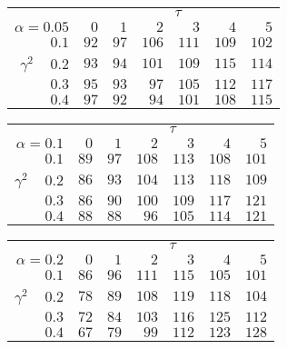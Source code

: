 \begin{tabular}{r|rrrrrr}
\hline\hline
 &\multicolumn{6}{c}{$\tau$} \\ 
 $\alpha = 0.05$ & $0$ & $1$ & $2$ & $3$ & $4$ & $5$ \\ 
 \hline$0.1$ & $ 92$ & $ 97$ & $106$ & $111$ & $109$ & $102$\\ 
$\gamma^2\;\;\;$ $0.2$ & $ 93$ & $ 94$ & $101$ & $109$ & $115$ & $114$\\ 
$0.3$ & $ 95$ & $ 93$ & $ 97$ & $105$ & $112$ & $117$\\ 
$0.4$ & $ 97$ & $ 92$ & $ 94$ & $101$ & $108$ & $115$\\ 
 \hline 
 \end{tabular}
 
 \vspace{2em} 
 
\begin{tabular}{r|rrrrrr}
\hline\hline
 &\multicolumn{6}{c}{$\tau$} \\ 
 $\alpha = 0.1$ & $0$ & $1$ & $2$ & $3$ & $4$ & $5$ \\ 
 \hline$0.1$ & $ 89$ & $ 97$ & $108$ & $113$ & $108$ & $101$\\ 
$\gamma^2\;\;\;$ $0.2$ & $ 86$ & $ 93$ & $104$ & $113$ & $118$ & $109$\\ 
$0.3$ & $ 86$ & $ 90$ & $100$ & $109$ & $117$ & $121$\\ 
$0.4$ & $ 88$ & $ 88$ & $ 96$ & $105$ & $114$ & $121$\\ 
 \hline 
 \end{tabular}
 
 \vspace{2em} 
 
\begin{tabular}{r|rrrrrr}
\hline\hline
 &\multicolumn{6}{c}{$\tau$} \\ 
 $\alpha = 0.2$ & $0$ & $1$ & $2$ & $3$ & $4$ & $5$ \\ 
 \hline$0.1$ & $ 86$ & $ 96$ & $111$ & $115$ & $105$ & $101$\\ 
$\gamma^2\;\;\;$ $0.2$ & $ 78$ & $ 89$ & $108$ & $119$ & $118$ & $104$\\ 
$0.3$ & $ 72$ & $ 84$ & $103$ & $116$ & $125$ & $112$\\ 
$0.4$ & $ 67$ & $ 79$ & $ 99$ & $112$ & $123$ & $128$\\ 
 \hline 
 \end{tabular}